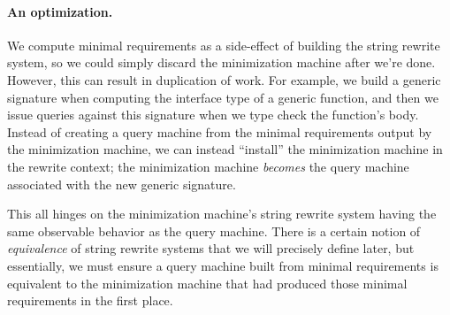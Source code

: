 \documentclass[../generics]{subfiles}
\begin{document}
\paragraph{An optimization.}
We compute minimal requirements as a side-effect of building the string rewrite system, so we could simply discard the minimization machine after we're done. However, this can result in duplication of work. For example, we build a generic signature when computing the interface type of a generic function, and then we issue queries against this signature when we type check the function's body. Instead of creating a query machine from the minimal requirements output by the minimization machine, we can instead ``install'' the minimization machine in the rewrite context; the minimization machine \emph{becomes} the query machine associated with the new generic signature.

\begin{center}
\end{center}

This all hinges on the minimization machine's string rewrite system having the same observable behavior as the query machine. There is a certain notion of \emph{equivalence} of string rewrite systems that we will precisely define later, but essentially, we must ensure a query machine built from minimal requirements is equivalent to the minimization machine that had produced those minimal requirements in the first place.
\end{document}
